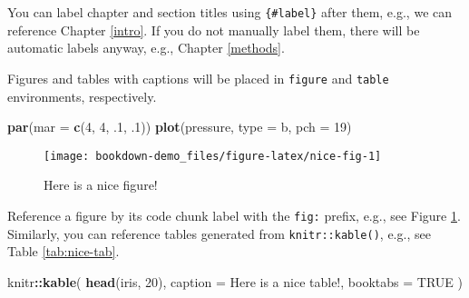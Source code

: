 \documentclass[
]{book}
\newenvironment{Shaded}{\begin{snugshade}}{\end{snugshade}}
\newcommand{\AttributeTok}[1]{\textcolor[rgb]{0.13,0.29,0.53}{#1}}
\newcommand{\ConstantTok}[1]{\textcolor[rgb]{0.56,0.35,0.01}{#1}}
\newcommand{\DecValTok}[1]{\textcolor[rgb]{0.00,0.00,0.81}{#1}}
\newcommand{\FunctionTok}[1]{\textcolor[rgb]{0.13,0.29,0.53}{\textbf{#1}}}
\newcommand{\NormalTok}[1]{#1}
\newcommand{\SpecialCharTok}[1]{\textcolor[rgb]{0.81,0.36,0.00}{\textbf{#1}}}
\newcommand{\StringTok}[1]{\textcolor[rgb]{0.31,0.60,0.02}{#1}}
\begin{document}
You can label chapter and section titles using \texttt{\{\#label\}} after them, e.g., we can reference Chapter \ref{intro}. If you do not manually label them, there will be automatic labels anyway, e.g., Chapter \ref{methods}.

Figures and tables with captions will be placed in \texttt{figure} and \texttt{table} environments, respectively.

\begin{Shaded}
\begin{Highlighting}[]
\FunctionTok{par}\NormalTok{(}\AttributeTok{mar =} \FunctionTok{c}\NormalTok{(}\DecValTok{4}\NormalTok{, }\DecValTok{4}\NormalTok{, .}\DecValTok{1}\NormalTok{, .}\DecValTok{1}\NormalTok{))}
\FunctionTok{plot}\NormalTok{(pressure, }\AttributeTok{type =} \StringTok{\textquotesingle{}b\textquotesingle{}}\NormalTok{, }\AttributeTok{pch =} \DecValTok{19}\NormalTok{)}
\end{Highlighting}
\end{Shaded}

\begin{figure}

{\centering \texttt{[image: bookdown-demo\_files/figure-latex/nice-fig-1]} 

}

\caption{Here is a nice figure!}\label{fig:nice-fig}
\end{figure}

Reference a figure by its code chunk label with the \texttt{fig:} prefix, e.g., see Figure \ref{fig:nice-fig}. Similarly, you can reference tables generated from \texttt{knitr::kable()}, e.g., see Table \ref{tab:nice-tab}.

\begin{Shaded}
\begin{Highlighting}[]
\NormalTok{knitr}\SpecialCharTok{::}\FunctionTok{kable}\NormalTok{(}
  \FunctionTok{head}\NormalTok{(iris, }\DecValTok{20}\NormalTok{), }\AttributeTok{caption =} \StringTok{\textquotesingle{}Here is a nice table!\textquotesingle{}}\NormalTok{,}
  \AttributeTok{booktabs =} \ConstantTok{TRUE}
\NormalTok{)}
\end{Highlighting}
\end{Shaded}
\end{document}
